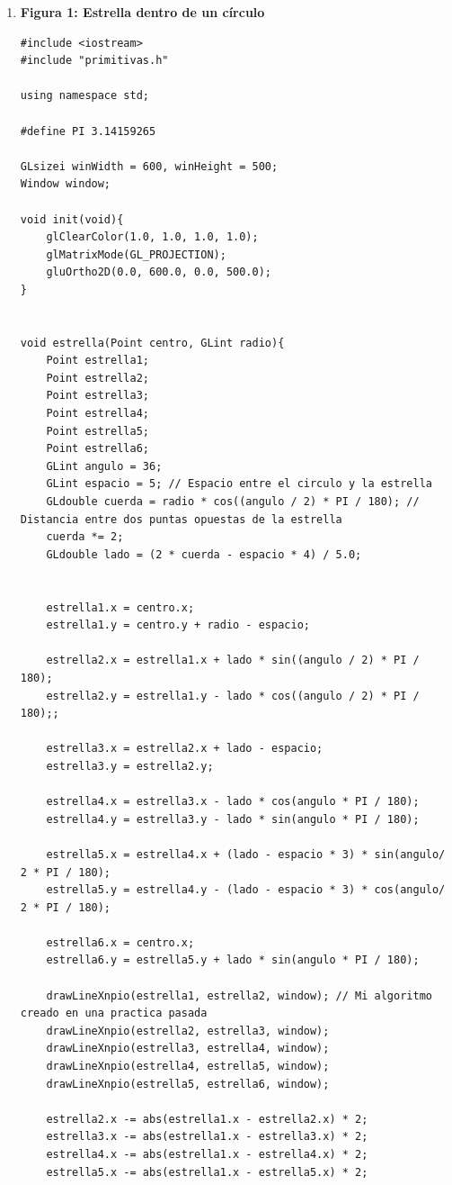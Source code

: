 \documentclass[a4paper,12pt]{article}
\begin{document}
\begin{enumerate}
 \item \textbf{Figura 1: Estrella dentro de un círculo}
 
 \begin{lstlisting}
#include <iostream>
#include "primitivas.h"

using namespace std;

#define PI 3.14159265

GLsizei winWidth = 600, winHeight = 500;
Window window;

void init(void){
    glClearColor(1.0, 1.0, 1.0, 1.0);
    glMatrixMode(GL_PROJECTION);
    gluOrtho2D(0.0, 600.0, 0.0, 500.0);
}


void estrella(Point centro, GLint radio){
    Point estrella1;
    Point estrella2;
    Point estrella3;
    Point estrella4;
    Point estrella5;
    Point estrella6;
    GLint angulo = 36;
    GLint espacio = 5; // Espacio entre el circulo y la estrella
    GLdouble cuerda = radio * cos((angulo / 2) * PI / 180); // Distancia entre dos puntas opuestas de la estrella
    cuerda *= 2;
    GLdouble lado = (2 * cuerda - espacio * 4) / 5.0;
    

    estrella1.x = centro.x;
    estrella1.y = centro.y + radio - espacio;

    estrella2.x = estrella1.x + lado * sin((angulo / 2) * PI / 180);
    estrella2.y = estrella1.y - lado * cos((angulo / 2) * PI / 180);;

    estrella3.x = estrella2.x + lado - espacio;
    estrella3.y = estrella2.y;
    
    estrella4.x = estrella3.x - lado * cos(angulo * PI / 180);
    estrella4.y = estrella3.y - lado * sin(angulo * PI / 180);

    estrella5.x = estrella4.x + (lado - espacio * 3) * sin(angulo/ 2 * PI / 180);
    estrella5.y = estrella4.y - (lado - espacio * 3) * cos(angulo/ 2 * PI / 180);

    estrella6.x = centro.x;
    estrella6.y = estrella5.y + lado * sin(angulo * PI / 180);

    drawLineXnpio(estrella1, estrella2, window); // Mi algoritmo creado en una practica pasada
    drawLineXnpio(estrella2, estrella3, window);
    drawLineXnpio(estrella3, estrella4, window);
    drawLineXnpio(estrella4, estrella5, window);
    drawLineXnpio(estrella5, estrella6, window);

    estrella2.x -= abs(estrella1.x - estrella2.x) * 2;
    estrella3.x -= abs(estrella1.x - estrella3.x) * 2;
    estrella4.x -= abs(estrella1.x - estrella4.x) * 2;
    estrella5.x -= abs(estrella1.x - estrella5.x) * 2;


\end{lstlisting}
\end{enumerate}
\end{document}
